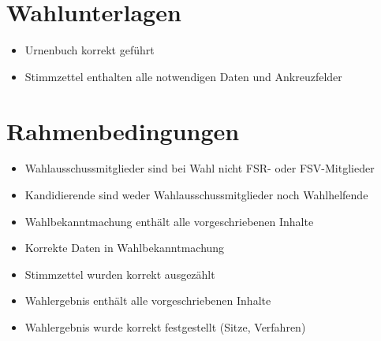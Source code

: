 \documentclass[a4paper]{scrartcl}
\begin{document}
\section{Wahlunterlagen}
\begin{itemize}[label=$\Box$]
\item Urnenbuch korrekt geführt
\item Stimmzettel enthalten alle notwendigen Daten und Ankreuzfelder
\end{itemize}







\section{Rahmenbedingungen}
\begin{itemize}[label=$\Box$]
\item Wahlausschussmitglieder sind bei Wahl nicht FSR- oder FSV-Mitglieder
\item Kandidierende sind weder Wahlausschussmitglieder noch Wahlhelfende
\item Wahlbekanntmachung enthält alle vorgeschriebenen Inhalte
\item Korrekte Daten in Wahlbekanntmachung
\item Stimmzettel wurden korrekt ausgezählt
\item Wahlergebnis enthält alle vorgeschriebenen Inhalte
\item Wahlergebnis wurde korrekt festgestellt (Sitze, Verfahren)
\end{itemize}



\end{document}
